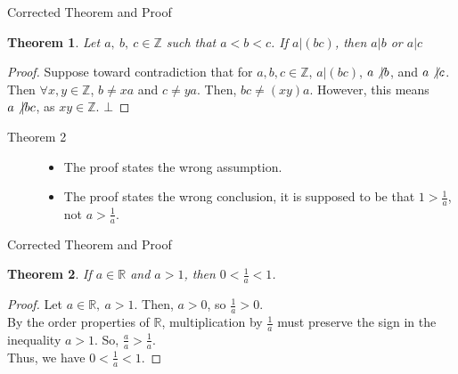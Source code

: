 \documentclass[9pt]{extarticle}
\newtheorem{theorem}{Theorem}
\newcommand{\Z}{\mathbb{Z}}
\newcommand{\R}{\mathbb{R}}
\begin{document}
  \begin{problem}{Corrected Theorem and Proof}
    \begin{theorem}
      Let $a,~b,~c\in \Z$ such that $a<b<c$. If $a|(bc)$, then $a|b$ or $a|c$
    \end{theorem}
    \begin{proof}
      Suppose toward contradiction that for  $a,b,c\in\Z$, $a \vert (bc)$, $a\not\vert b$, and $a\not\vert c$. Then $\forall x,y\in\Z$, $b\neq xa$ and $c \neq ya$. Then, $bc \neq (xy)a$. However, this means $a \not\vert bc$, as $xy\in\Z$. $\bot$
    \end{proof}
  \end{problem}
  \begin{description}
    \item[Theorem 2] \hfill
      \begin{itemize}
        \item The proof states the wrong assumption.
        \item The proof states the wrong conclusion, it is supposed to be that $1 > \frac{1}{a}$, not $a > \frac{1}{a}$.
      \end{itemize}
  \end{description}
  \begin{problem}{Corrected Theorem and Proof}
    \begin{theorem}
      If $a\in\R$ and $a > 1$, then $0 < \frac{1}{a} < 1$.
    \end{theorem}
    \begin{proof}
      Let $a\in\R,~a>1$. Then, $a > 0$, so $\frac{1}{a} > 0$.\\

      By the order properties of $\R$, multiplication by $\frac{1}{a}$ must preserve the sign in the inequality $a > 1$. So, $\frac{a}{a} > \frac{1}{a}$.\\

      Thus, we have $0 < \frac{1}{a} < 1$.
    \end{proof}
  \end{problem}
\end{document}
